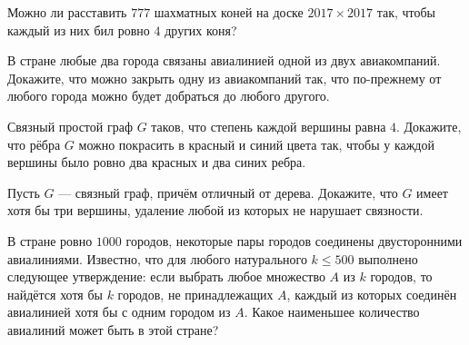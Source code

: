 \begin{problems}
\item Можно ли расставить $777$ шахматных коней на доске $2017\times2017$ так, чтобы каждый из них бил ровно $4$ других коня?

\item В стране любые два города связаны авиалинией одной из двух авиакомпаний. Докажите, что можно закрыть одну из авиакомпаний так, что по-прежнему от любого города можно будет добраться до любого другого.

\item Связный простой граф $G$ таков, что степень каждой вершины равна $4$. Докажите, что рёбра $G$ можно покрасить в красный и синий цвета так, чтобы у каждой вершины было ровно два красных и два синих ребра.

\item Пусть $G$ --- связный граф, причём отличный от дерева. Докажите, что $G$ имеет хотя бы три вершины, удаление любой из которых не нарушает связности.

\item В стране ровно $1000$ городов, некоторые пары городов соединены двусторонними авиалиниями. Известно, что для любого натурального $k\le500$ выполнено следующее утверждение: если выбрать любое множество $A$ из $k$ городов, то найдётся хотя бы $k$ городов, не принадлежащих $A$, каждый из которых соединён авиалинией хотя бы с одним городом из $A$. Какое наименьшее количество авиалиний может быть в этой стране?

\end{problems}


